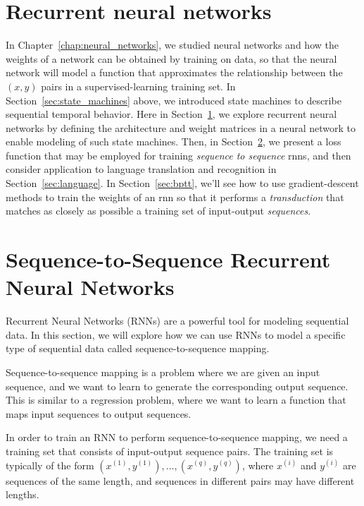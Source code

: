     


\section{Recurrent neural networks}
\label{sec:rnn_model}

In Chapter~\ref{chap:neural_networks}, we studied neural networks and
how the weights of a network can be obtained by training on data, so
that the neural network will model a function that approximates the
relationship between the $(x, y)$ pairs in a supervised-learning
training set.  In Section~\ref{sec:state_machines} above, we
introduced state machines to describe sequential temporal
behavior. Here in Section~\ref{sec:rnn_model}, we explore recurrent
neural networks by defining the architecture and weight matrices in a
neural network to enable modeling of such state machines.  Then, in
Section~\ref{sec:seq2seq_rnn}, we present a loss function that may be
employed for training {\em sequence to sequence} {\sc rnn}s, and then
consider application to language translation and recognition in
Section~\ref{sec:language}.  In Section~\ref{sec:bptt}, we'll see how
to use gradient-descent methods to train the weights of an {\sc rnn}
so that it performs a {\em transduction} that matches as closely as
possible a training set of input-output {\em sequences}.





\section{Sequence-to-Sequence Recurrent Neural Networks}
    \label{sec:seq2seq_rnn}
    
    Recurrent Neural Networks (RNNs) are a powerful tool for modeling sequential data. In this section, we will explore how we can use RNNs to model a specific type of sequential data called sequence-to-sequence mapping.
    
    Sequence-to-sequence mapping is a problem where we are given an input sequence, and we want to learn to generate the corresponding output sequence. This is similar to a regression problem, where we want to learn a function that maps input sequences to output sequences.
    
    In order to train an RNN to perform sequence-to-sequence mapping, we need a training set that consists of input-output sequence pairs. The training set is typically of the form ${(x^{(1)}, y^{(1)}), \dots, (x^{(q)}, y^{(q)})}$, where $x^{(i)}$ and $y^{(i)}$ are sequences of the same length, and sequences in different pairs may have different lengths.
    
